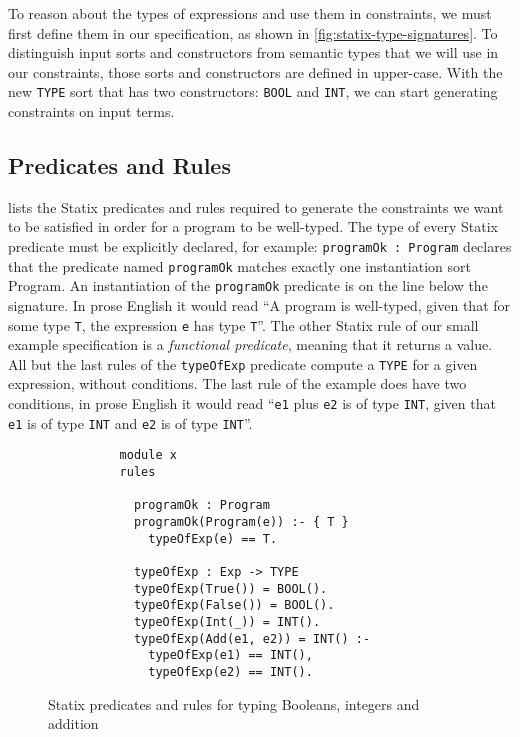       To reason about the types of expressions and use them in constraints, we must first define them in our specification, as shown in \cref{fig:statix-type-signatures}. To distinguish input sorts and constructors from semantic types that we will use in our constraints, those sorts and constructors are defined in upper-case. With the new \texttt{TYPE} sort that has two constructors: \texttt{BOOL} and \texttt{INT}, we can start generating constraints on input terms.

    \subsection{Predicates and Rules}

       lists the Statix predicates and rules required to generate the constraints we want to be satisfied in order for a program to be well-typed. The type of every Statix predicate must be explicitly declared, for example: \texttt{programOk : Program} declares that the predicate named \texttt{programOk} matches exactly one instantiation sort Program. An instantiation of the \texttt{programOk} predicate is on the line below the signature. In prose English it would read ``A program is well-typed, given that for some type \texttt{T}, the expression \texttt{e} has type \texttt{T}''. The other Statix rule of our small example specification is a \textit{functional predicate}, meaning that it returns a value. All but the last rules of the \texttt{typeOfExp} predicate compute a \texttt{TYPE} for a given expression, without conditions. The last rule of the example does have two conditions, in prose English it would read ``\texttt{e1} plus \texttt{e2} is of type \texttt{INT}, given that \texttt{e1} is of type \texttt{INT} and \texttt{e2} is of type \texttt{INT}''.

      \begin{figure}[H]
        \begin{verbatim}
          module x
          rules

            programOk : Program
            programOk(Program(e)) :- { T }
              typeOfExp(e) == T.

            typeOfExp : Exp -> TYPE
            typeOfExp(True()) = BOOL().
            typeOfExp(False()) = BOOL().
            typeOfExp(Int(_)) = INT().
            typeOfExp(Add(e1, e2)) = INT() :-
              typeOfExp(e1) == INT(),
              typeOfExp(e2) == INT().
        \end{verbatim}
        \caption{\label{fig:statix-basic-rules}Statix predicates and rules for typing Booleans, integers and addition}
      \end{figure}

